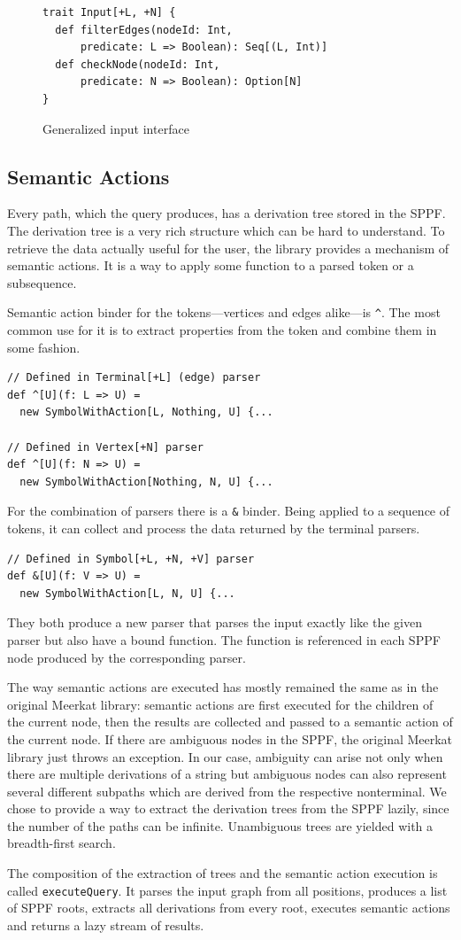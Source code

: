 \begin{figure}[h]
\begin{lstlisting}
trait Input[+L, +N] {
  def filterEdges(nodeId: Int,
      predicate: L => Boolean): Seq[(L, Int)]
  def checkNode(nodeId: Int,
      predicate: N => Boolean): Option[N]
}

\end{lstlisting}
\caption{Generalized input interface}
\label{fig:input}
\end{figure}

\subsection{Semantic Actions}
\label{sec:semanticActions}

Every path, which the query produces, has a derivation tree stored in the SPPF.
The derivation tree is a very rich structure which can be hard to understand.
To retrieve the data actually useful for the user, the library provides a mechanism of semantic actions.
It is a way to apply some function to a parsed token or a subsequence.

Semantic action binder for the tokens---vertices and edges alike---is \lstinline{^}. The most common use for it is to extract properties from the token and combine them in some fashion.

\begin{lstlisting}
// Defined in Terminal[+L] (edge) parser
def ^[U](f: L => U) =
  new SymbolWithAction[L, Nothing, U] {...

// Defined in Vertex[+N] parser
def ^[U](f: N => U) =
  new SymbolWithAction[Nothing, N, U] {...
\end{lstlisting}

For the combination of parsers there is a \lstinline{&} binder. Being  applied to a sequence of tokens, it can collect and process the data returned by the terminal parsers.
\begin{lstlisting}
// Defined in Symbol[+L, +N, +V] parser
def &[U](f: V => U) =
  new SymbolWithAction[L, N, U] {...
\end{lstlisting}

They both produce a new parser that parses the input exactly like the given parser but also have a bound function.
The function is referenced in each SPPF node produced by the corresponding parser.

The way semantic actions are executed has mostly remained the same as in the original Meerkat library: semantic actions are first executed for the children of the current node, then the results are collected and passed to a semantic action of the current node.
If there are ambiguous nodes in the SPPF, the original Meerkat library just throws an exception.
In our case, ambiguity can arise not only when there are multiple derivations of a string but ambiguous nodes can also represent several different subpaths which are derived from the respective nonterminal.
We chose to provide a way to extract the derivation trees from the SPPF lazily, since the number of the paths can be infinite.
Unambiguous trees are yielded with a breadth-first search.

The composition of the extraction of trees and the semantic action execution is called \lstinline{executeQuery}.
It parses the input graph from all positions, produces a list of SPPF roots, extracts all derivations from every root, executes semantic actions and returns a lazy stream of results.